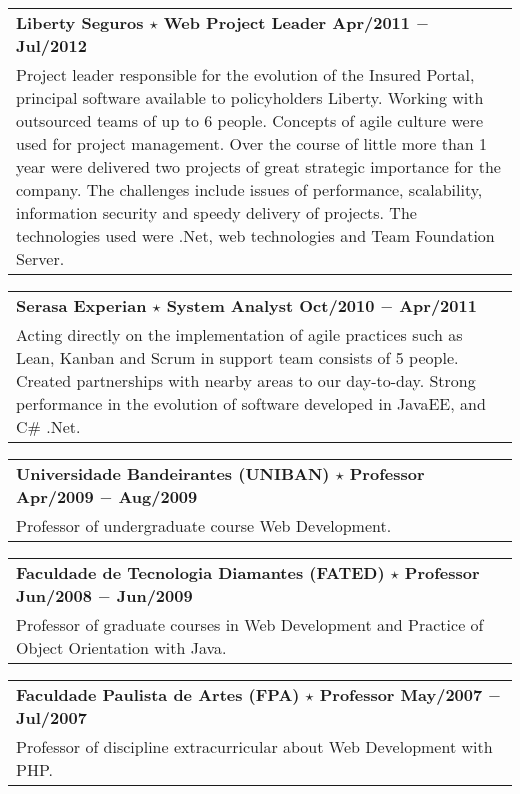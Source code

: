 \documentclass[a4paper, oneside, final]{scrartcl}
\newcommand{\vspc}{\vspace{0.15cm}} %
\begin{document}
\begin{center}
\begin{tabularx}{1\linewidth}{X}
{\bf Liberty Seguros $\star$ Web Project Leader \hfill Apr/2011 $-$ Jul/2012} \\
Project leader responsible for the evolution of the Insured Portal, principal software available to policyholders Liberty. Working with outsourced teams of up to 6 people. Concepts of agile culture were used for project management. Over the course of little more than 1 year were delivered two projects of great strategic importance for the company. The challenges include issues of performance, scalability, information security and speedy delivery of projects. The technologies used were .Net, web technologies and Team Foundation Server. \vspc\\
\end{tabularx}

\begin{tabularx}{1\linewidth}{X}
{\bf Serasa Experian $\star$  System Analyst \hfill Oct/2010 $-$ Apr/2011} \\
Acting directly on the implementation of agile practices such as Lean, Kanban and Scrum in support team consists of 5 people. Created partnerships with nearby areas to our day-to-day. Strong performance in the evolution of software developed in JavaEE, and C\# .Net. \vspc\\
\end{tabularx}

\begin{tabularx}{1\linewidth}{X}
{\bf Universidade Bandeirantes (UNIBAN) $\star$ Professor \hfill Apr/2009 $-$ Aug/2009} \\
Professor of undergraduate course Web Development. \vspc\\
\end{tabularx}

\begin{tabularx}{1\linewidth}{X}
{\bf Faculdade de Tecnologia Diamantes (FATED) $\star$ Professor \hfill Jun/2008 $-$ Jun/2009} \\
Professor of graduate courses in Web Development and Practice of Object Orientation with Java. \vspc\\
\end{tabularx}

\begin{tabularx}{1\linewidth}{X}
{\bf Faculdade Paulista de Artes (FPA) $\star$ Professor  \hfill May/2007 $-$ Jul/2007} \\
Professor of discipline extracurricular about Web Development with PHP. \vspc\\
\end{tabularx}


\end{center}
\end{document}
